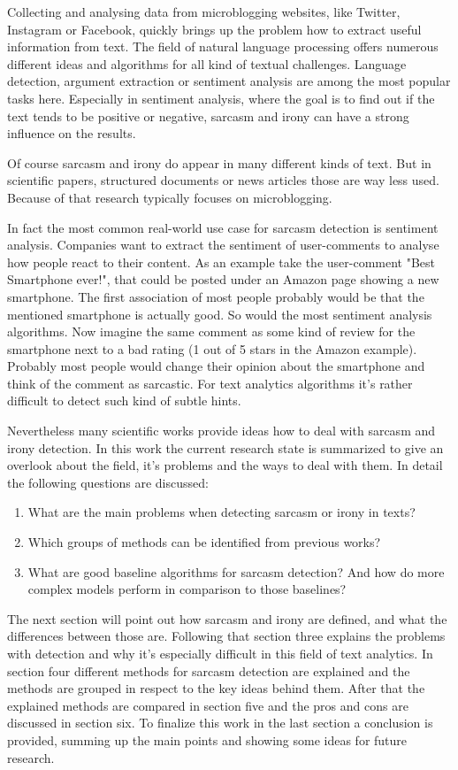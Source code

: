 \documentclass[sigconf,  review=false, nonacm=true]{acmart}
\begin{document}
Collecting and analysing data from microblogging websites, like Twitter, Instagram or Facebook, quickly brings up the problem how to extract useful information from text. The field of natural language processing offers numerous different ideas and algorithms for all kind of textual challenges. Language detection, argument extraction or sentiment analysis are among the most popular tasks here. Especially in sentiment analysis, where the goal is to find out if the text tends to be positive or negative, sarcasm and irony can have a strong influence on the results.  

Of course sarcasm and irony do appear in many different kinds of text. But in scientific papers, structured documents or news articles those are way less used. Because of that research typically focuses on microblogging.

In fact the most common real-world use case for sarcasm detection is sentiment analysis. Companies want to extract the sentiment of user-comments to analyse how people react to their content. As an example take the user-comment "Best Smartphone ever!", that could be posted under an Amazon page showing a new smartphone. The first association of most people probably would be that the mentioned smartphone is actually good. So would the most sentiment analysis algorithms. Now imagine the same comment as some kind of review for the smartphone next to a bad rating (1 out of 5 stars in the Amazon example). Probably most people would change their opinion about the smartphone and think of the comment as sarcastic. For text analytics algorithms it's rather difficult to detect such kind of subtle hints.

Nevertheless many scientific works provide ideas how to deal with sarcasm and irony detection. In this work the current research state is summarized to give an overlook about the field, it's problems and the ways to deal with them. In detail the following questions are discussed:
\begin{enumerate} 
	\item What are the main problems when detecting sarcasm or irony in texts?
	\item Which groups of methods can be identified from previous works?
	\item What are good baseline algorithms for sarcasm detection? And how do more complex models perform in comparison to those baselines?
\end{enumerate}


The next section will point out how sarcasm and irony are defined, and what the differences between those are. Following that section three explains the problems with detection and why it's especially difficult in this field of text analytics. In section four different methods for sarcasm detection are explained and the methods are grouped in respect to the key ideas behind them. After that the explained methods are compared in section five and the pros and cons are discussed in section six. To finalize this work in the last section a conclusion is provided, summing up the main points and showing some ideas for future research.
\end{document}
